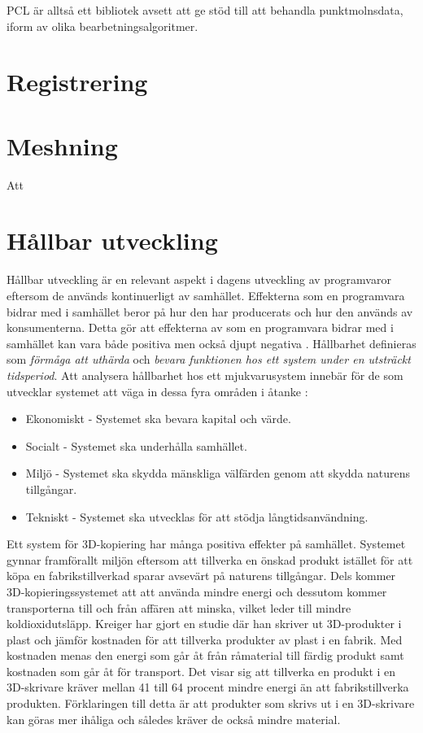 PCL är alltså ett bibliotek avsett att ge stöd till att behandla punktmolnsdata, iform av olika bearbetningsalgoritmer.
\section{Registrering}
\section{Meshning}
Att 



\section{Hållbar utveckling}
Hållbar utveckling är en relevant aspekt i dagens utveckling av programvaror eftersom de används kontinuerligt av samhället. Effekterna som en programvara bidrar med i samhället beror på hur den har producerats och hur den används av konsumenterna. Detta gör att effekterna av som en programvara bidrar med i samhället kan vara både positiva men också djupt negativa \cite{raturi2014developing}. Hållbarhet definieras som \textit{förmåga att uthärda} och \textit{bevara funktionen hos ett system under en utsträckt tidsperiod}. Att analysera hållbarhet hos ett mjukvarusystem innebär för de som utvecklar systemet att väga in dessa fyra områden i åtanke \cite{lago2015framing}:

\begin{itemize}
	\item Ekonomiskt -  Systemet ska bevara kapital och värde.
	\item Socialt - Systemet ska underhålla samhället.
	\item Miljö - Systemet ska skydda mänskliga välfärden genom att skydda naturens tillgångar.
	\item Tekniskt - Systemet ska utvecklas för att stödja långtidsanvändning.
\end{itemize}

Ett system för 3D-kopiering har många positiva effekter på samhället. Systemet gynnar framförallt miljön eftersom att tillverka en önskad produkt istället för att köpa en fabrikstillverkad sparar avsevärt på naturens tillgångar. Dels kommer 3D-kopieringssystemet att att använda mindre energi och dessutom kommer transporterna till och från affären att minska, vilket leder till mindre koldioxidutsläpp. Kreiger \cite{kreiger2013environmental} har gjort en studie där han skriver ut 3D-produkter i plast och jämför kostnaden för att tillverka produkter av plast i en fabrik. Med kostnaden menas den energi som går åt från råmaterial till färdig produkt samt kostnaden som går åt för transport. Det visar sig att tillverka en produkt i en 3D-skrivare kräver mellan 41 till 64 procent mindre energi än att fabrikstillverka produkten. Förklaringen till detta är att produkter som skrivs ut i en 3D-skrivare kan göras mer ihåliga och således kräver de också mindre material. 

